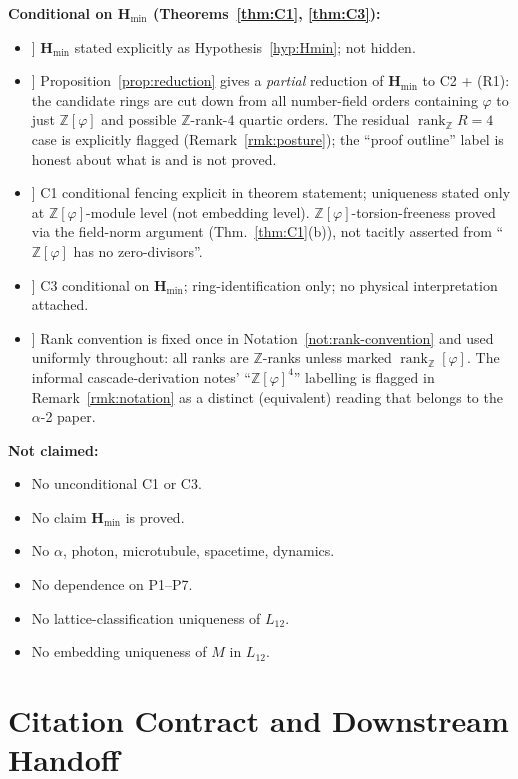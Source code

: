 \documentclass[11pt, a4paper]{amsart}
\theoremstyle{definition}
\newcommand{\Z}{\mathbb{Z}}
\newcommand{\rk}{\operatorname{rank}}
\newcommand{\Hmin}{\mathbf{H}_{\min}}
\newcommand{\Ophi}{\mathbb{Z}[\varphi]}
\begin{document}
\textbf{Conditional on $\Hmin$ (Theorems~\ref{thm:C1}, \ref{thm:C3}):}
\begin{itemize}
\item[[6]] $\Hmin$ stated explicitly as
  Hypothesis~\ref{hyp:Hmin}; not hidden.
\item[[7]] Proposition~\ref{prop:reduction} gives a \emph{partial}
  reduction of $\Hmin$ to C2 + (R1): the candidate rings are
  cut down from all number-field orders containing $\varphi$
  to just $\Ophi$ and possible $\Z$-rank-$4$ quartic orders.
  The residual $\rk_\Z R = 4$ case is explicitly flagged
  (Remark~\ref{rmk:posture}); the ``proof outline'' label is
  honest about what is and is not proved.
\item[[8]] C1 conditional fencing explicit in theorem
  statement; uniqueness stated only at $\Ophi$-module level
  (not embedding level). $\Ophi$-torsion-freeness proved via
  the field-norm argument (Thm.~\ref{thm:C1}(b)), not
  tacitly asserted from ``$\Ophi$ has no zero-divisors''.
\item[[9]] C3 conditional on $\Hmin$; ring-identification only;
  no physical interpretation attached.
\item[[10]] Rank convention is fixed once in
  Notation~\ref{not:rank-convention} and used uniformly
  throughout: all ranks are $\Z$-ranks unless marked
  $\rk_\Ophi$. The informal cascade-derivation notes'
  ``$\Ophi^{4}$'' labelling is flagged in
  Remark~\ref{rmk:notation} as a distinct (equivalent) reading
  that belongs to the $\alpha$-2 paper.
\end{itemize}

\textbf{Not claimed:}
\begin{itemize}
\item No unconditional C1 or C3.
\item No claim $\Hmin$ is proved.
\item No $\alpha$, photon, microtubule, spacetime, dynamics.
\item No dependence on P1--P7.
\item No lattice-classification uniqueness of $L_{12}$.
\item No embedding uniqueness of $M$ in $L_{12}$.
\end{itemize}

\section{Citation Contract and Downstream Handoff}
\label{sec:handoff}
\end{document}
